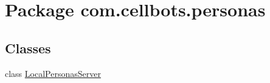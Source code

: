 \hypertarget{namespacecom_1_1cellbots_1_1personas}{\section{Package com.\-cellbots.\-personas}
\label{namespacecom_1_1cellbots_1_1personas}
}
\subsection*{Classes}
\begin{DoxyCompactItemize}
\item 
class \hyperlink{classcom_1_1cellbots_1_1personas_1_1_local_personas_server}{Local\-Personas\-Server}
\end{DoxyCompactItemize}
